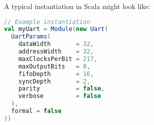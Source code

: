 \noindent
A typical instantiation in Scala might look like:
\begin{lstlisting}[language=Scala]
// Example instantiation
val myUart = Module(new Uart(
  UartParams(
    dataWidth       = 32,
    addressWidth    = 32,
    maxClocksPerBit = 217,
    maxOutputBits   = 8,
    fifoDepth       = 16,
    syncDepth       = 2,
    parity          = false,
    verbose         = false
  ),
  formal = false
))
\end{lstlisting}
